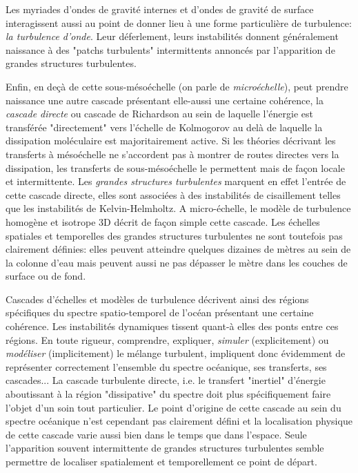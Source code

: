 Les myriades d'ondes de gravité internes et d'ondes de gravité de surface interagissent aussi au point de donner lieu à une forme particulière de turbulence: \textit{la turbulence d'onde}. Leur déferlement, leurs instabilités donnent généralement naissance à des "patchs turbulents" intermittents annoncés par l'apparition de grandes structures turbulentes.

Enfin, en deçà de cette sous-mésoéchelle (on parle de \textit{microéchelle}), peut prendre naissance une autre cascade présentant elle-aussi une certaine cohérence, la \textit{cascade directe} ou cascade de Richardson au sein de laquelle l'énergie est transférée "directement" vers l'échelle de Kolmogorov au delà de laquelle la dissipation moléculaire est majoritairement active. Si les théories décrivant les transferts à mésoéchelle ne s'accordent pas à montrer de routes directes vers la dissipation, les transferts de sous-mésoéchelle le permettent mais de façon locale et intermittente.
Les \textit{grandes structures turbulentes} marquent en effet l'entrée de cette cascade directe, elles sont associées à des instabilités de cisaillement telles que les instabilités de Kelvin-Helmholtz. A micro-échelle, le modèle de turbulence homogène et isotrope 3D décrit de façon simple cette cascade. Les échelles spatiales et temporelles des grandes structures turbulentes ne sont toutefois pas clairement définies: elles peuvent atteindre quelques dizaines de mètres au sein de la colonne d'eau mais peuvent aussi ne pas dépasser le mètre dans les couches de surface ou de fond.

Cascades d'échelles et modèles de turbulence décrivent ainsi des régions spécifiques du spectre spatio-temporel de l'océan présentant une certaine cohérence. Les instabilités dynamiques tissent quant-à elles des ponts entre ces régions. En toute rigueur, comprendre, expliquer, \textit{simuler} (explicitement) ou \textit{modéliser} (implicitement) le mélange turbulent, impliquent donc évidemment de représenter correctement l'ensemble du spectre océanique, ses transferts, ses cascades... La cascade turbulente directe, i.e. le transfert "inertiel" d'énergie aboutissant à la région "dissipative" du spectre doit plus spécifiquement faire l'objet d'un soin tout particulier. Le point d'origine de cette cascade au sein du spectre océanique n'est cependant pas clairement défini et la localisation physique de cette cascade varie aussi bien dans le temps que dans l'espace. Seule l'apparition souvent intermittente de grandes structures turbulentes semble permettre de localiser spatialement et temporellement ce point de départ.

